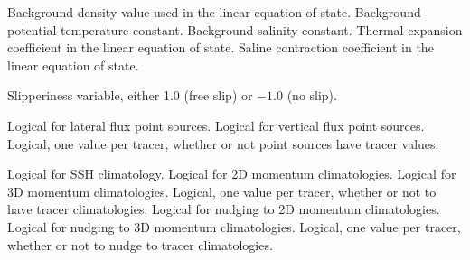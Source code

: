\begin{klist}
\begin{klist}
     \end{klist}
    \mbox{}
     \begin{klist}
              Background density value used in
    the linear equation of state.
              Background potential temperature constant.
              Background salinity constant.
           Thermal expansion coefficient in the linear
    equation of state.
           Saline contraction coefficient in the linear
    equation of state.
     \end{klist}
    \mbox{}
     \begin{klist}
          Slipperiness variable, either 1.0 (free
     slip) or $-1.0$ (no slip).
     \end{klist}
    \mbox{}
     \begin{klist}
        Logical for lateral flux point sources.
        Logical for vertical flux point sources.
        Logical, one value per tracer,
whether or not point sources have tracer values.
     \end{klist}
    \mbox{}
     \begin{klist}
        Logical for SSH climatology.
        Logical for 2D momentum climatologies.
        Logical for 3D momentum climatologies.
        Logical, one value per tracer,
whether or not to have tracer climatologies.
        Logical for nudging to 2D momentum climatologies.
        Logical for nudging to 3D momentum climatologies.
        Logical, one value per tracer,
whether or not to nudge to tracer climatologies.
     \end{klist}

\end{klist}
